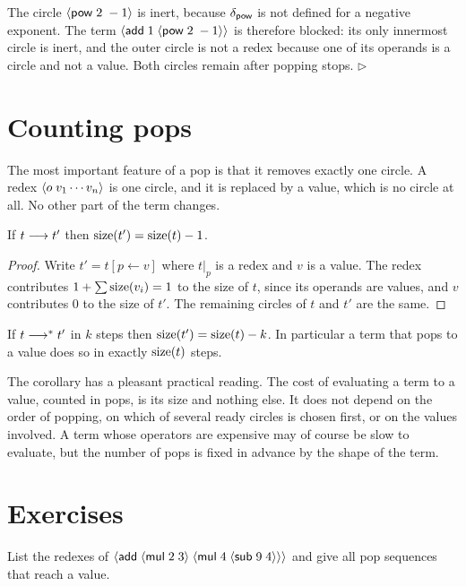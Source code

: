 \begin{example}
The circle $\langle \mathsf{pow}\; 2\; -1\rangle$ is inert, because $\delta_{\mathsf{pow}}$ is not defined for a negative exponent. The term $\langle \mathsf{add}\; 1\; \langle \mathsf{pow}\; 2\; -1\rangle\rangle$ is therefore blocked: its only innermost circle is inert, and the outer circle is not a redex because one of its operands is a circle and not a value. Both circles remain after popping stops. \hfill$\triangleright$
\end{example}

\section{Counting pops}

The most important feature of a pop is that it removes exactly one circle. A redex $\langle o\;v_1\cdots v_n\rangle$ is one circle, and it is replaced by a value, which is no circle at all. No other part of the term changes.

\begin{proposition}\label{prop:size-drop}
If $t\longrightarrow t'$ then $\operatorname{size}(t')=\operatorname{size}(t)-1$.
\end{proposition}
\begin{proof}
Write $t' = t[p\leftarrow v]$ where $t|_p$ is a redex and $v$ is a value. The redex contributes $1+\sum\operatorname{size}(v_i)=1$ to the size of $t$, since its operands are values, and $v$ contributes $0$ to the size of $t'$. The remaining circles of $t$ and $t'$ are the same.
\end{proof}

\begin{corollary}\label{cor:length}
If $t\longrightarrow^{*} t'$ in $k$ steps then $\operatorname{size}(t')=\operatorname{size}(t)-k$. In particular a term that pops to a value does so in exactly $\operatorname{size}(t)$ steps.
\end{corollary}

The corollary has a pleasant practical reading. The cost of evaluating a term to a value, counted in pops, is its size and nothing else. It does not depend on the order of popping, on which of several ready circles is chosen first, or on the values involved. A term whose operators are expensive may of course be slow to evaluate, but the number of pops is fixed in advance by the shape of the term.

\section*{Exercises}

\begin{exercise}[\dag]\label{ex:ch3-redexes}
List the redexes of $\langle \mathsf{add}\; \langle \mathsf{mul}\; 2\; 3\rangle\; \langle \mathsf{mul}\; 4\; \langle \mathsf{sub}\; 9\; 4\rangle\rangle\rangle$ and give all pop sequences that reach a value.
\end{exercise}

